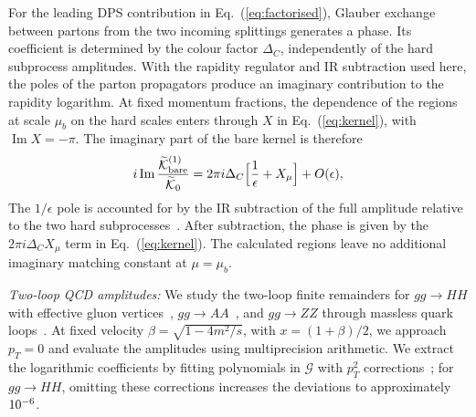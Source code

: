 \documentclass[%
 twocolumn,
 superscriptaddress,
 preprintnumbers,
 nofootinbib,
 amsmath,amssymb,
 aps,
 prl,
]{revtex4-2}
\newcommand{\G}{\mathcal G}
\newcommand{\DD}{\Delta_C}
\newcommand{\Kt}{\widetilde{\mathcal K}}
\begin{document}
For the leading DPS contribution in Eq.~(\ref{eq:factorised}),
Glauber exchange between partons from the two incoming
splittings generates a phase. Its coefficient is determined
by the colour factor $\DD$, independently of the hard
subprocess amplitudes. With the rapidity regulator and
IR subtraction used here, the poles of the parton
propagators produce an imaginary contribution to the
rapidity logarithm. At fixed momentum
fractions, the dependence of the regions at scale $\mu_b$
on the hard scales enters through $X$ in
Eq.~(\ref{eq:kernel}), with $\operatorname{Im}X=-\pi$.
The imaginary part of the bare kernel is therefore
\begin{equation}
i\,{\rm Im}\,\frac{\Kt^{(1)}_{\rm bare}}{\Kt_0}
=2\pi i\DD\Big[\frac1\epsilon+X_\mu\Big]+O(\epsilon),
\label{eq:imK}
\end{equation}
The $1/\epsilon$ pole is accounted for by the IR subtraction
of the full amplitude relative to the two hard
subprocesses~\cite{Catani:1998bh}. After subtraction, the
phase is given by the $2\pi i\DD X_\mu$ term in
Eq.~(\ref{eq:kernel}). The calculated regions leave no
additional imaginary matching constant at $\mu=\mu_b$.

\textit{Two-loop QCD amplitudes:}
We study the two-loop finite remainders for $gg\to HH$
with effective gluon vertices~\cite{Banerjee:2018lfq},
$gg\to AA$~\cite{Bhattacharya:2019oun},
and $gg\to ZZ$ through massless quark loops~\cite{vonManteuffel:2015msa}.
At fixed velocity $\beta=\sqrt{1-4m^2/s}$,
with $x=(1+\beta)/2$, we approach $p_T=0$
and evaluate the amplitudes using multiprecision
arithmetic. We extract the logarithmic coefficients
by fitting polynomials in $\G$ with $p_T^2$
corrections~\cite{SM}; for $gg\to HH$, omitting
these corrections increases the deviations
to approximately $10^{-6}$.
\end{document}
